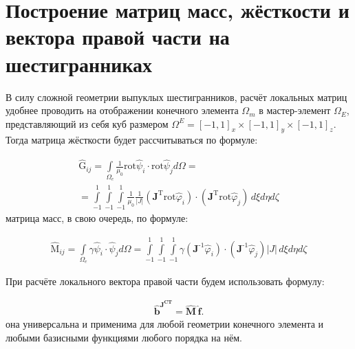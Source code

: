 \section{Построение матриц масс, жёсткости и вектора правой части на шестигранниках}

В силу сложной геометрии выпуклых шестигранников, расчёт локальных матриц удобнее проводить на отображении конечного элемента $\Omega_m$ в мастер-элемент $\Omega_E$, представляющий из себя куб размером $\Omega^E = [-1, 1]_x \times [-1, 1]_y \times [-1, 1]_z$. Тогда матрица жёсткости будет рассчитываться по формуле:

\begin{equation} \label{eq_1_11}
\begin{gathered}
	\hat{\text{G}}_{ij} = \int \limits_{\Omega_e} \frac{1}{\mu_0} \text{rot}  \hat{\text{$\psi$}}_i \cdot \text{rot} \hat{\text{$\psi$}}_j d \Omega = \\ = \int \limits_{-1}^1 \int \limits_{-1}^1 \int \limits_{-1}^1 \frac{1}{\mu_0} \frac{1}{|J|} \left( \textbf{J}^{\text{T}} \text{rot} \hat{\varphi}_i \right) \cdot \left( \textbf{J}^{\text{T}} \text{rot} \hat{\varphi}_j \right) \, d \xi d \eta d \zeta
\end{gathered}
\end{equation}
матрица масс, в свою очередь, по формуле:

\begin{equation} \label{eq_1_12}
	\begin{gathered}
		\hat{\text{M}}_{ij} = \int \limits_{\Omega_e} \gamma  \hat{\text{$\psi$}}_i \cdot \hat{\text{$\psi$}}_j d \Omega = \int \limits_{-1}^1 \int \limits_{-1}^1 \int \limits_{-1}^1 \gamma  \left( \textbf{J}^{\text{-1}} \hat{\varphi}_i \right) \cdot \left( \textbf{J}^{\text{-1}} \hat{\varphi}_j \right) |J| \, d \xi d \eta d \zeta
	\end{gathered}
\end{equation}

При расчёте локального вектора правой части будем использовать формулу:

\begin{equation} \label{eq_1_13}
	\begin{gathered}
		\hat{\textbf{b}}^{\textbf{J}^{\textbf{CT}}} = \hat{\textbf{M}} \, \hat{\textbf{f}}.
	\end{gathered}
\end{equation}
она универсальна и применима для любой геометрии конечного элемента и любыми базисными функциями любого порядка на нём.

